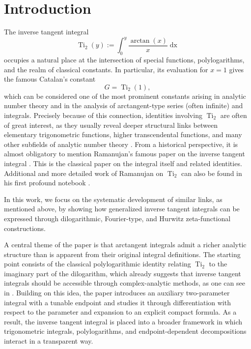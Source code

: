 \documentclass[preprint,12pt,nopreprintline]{elsarticle}
\begin{document}
\newpage

\section{Introduction}

The inverse tangent integral
\begin{equation}
\operatorname{Ti}_2\left(y\right):=\int_0^y\frac{\operatorname{arctan}\left(x\right)}{x}\operatorname{dx}
\end{equation}
occupies a natural place at the intersection of special functions, polylogarithms, and the realm of classical constants. In particular, its evaluation for \(x=1\) gives the famous Catalan’s constant
\begin{equation}
G=\operatorname{Ti}_2\left(1\right),
\end{equation}
which can be considered one of the most prominent constants arising in analytic number theory and in the analysis of arctangent-type series (often infinite) and integrals. Precisely because of this connection, identities involving $\operatorname{Ti}_2$ are often of great interest, as they usually reveal deeper structural links between elementary trigonometric functions, higher transcendental functions, and many other subfields of analytic number theory \cite{lewin1958dilogarithms,campbell2022special}. From a historical perspective, it is almost obligatory to mention Ramanujan’s famous paper on the inverse tangent integral \cite{ramanujan1915integral}. This is the classical paper on the integral itself and related identities. Additional and more detailed work of Ramanujan on $\operatorname{Ti}_2$ can also be found in his first profound notebook \cite{berndt1985ramanujan}. 

In this work, we focus on the systematic development of similar links, as mentioned above, by showing how generalized inverse tangent integrals can be expressed through dilogarithmic, Fourier-type, and Hurwitz zeta-functional constructions.

A central theme of the paper is that arctangent integrals admit a richer analytic structure than is apparent from their original integral definitions. The starting point consists of the classical polylogarithmic identity relating $\operatorname{Ti}_2$ to the imaginary part of the dilogarithm, which already suggests that inverse tangent integrals should be accessible through complex-analytic methods, as one can see in \cite{maximon2003dilogarithm,wood1992computation}. Building on this idea, the paper introduces an auxiliary two-parameter integral with a tunable endpoint and studies it through differentiation with respect to the parameter and expansion to an explicit compact formula. As a result, the inverse tangent integral is placed into a broader framework in which trigonometric integrals, polylogarithms, and endpoint-dependent decompositions interact in a transparent way.
\end{document}
